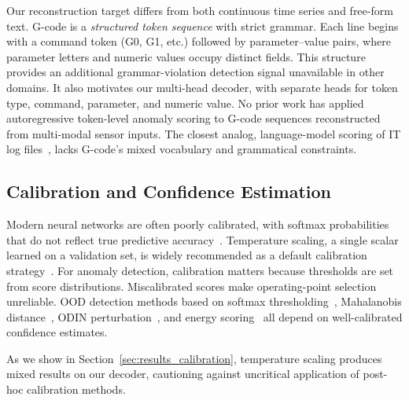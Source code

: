 Our reconstruction target differs from both continuous time series and free-form text.
G-code is a \emph{structured token sequence} with strict grammar.
Each line begins with a command token (G0, G1, etc.) followed by parameter--value pairs, where parameter letters and numeric values occupy distinct fields.
This structure provides an additional grammar-violation detection signal unavailable in other domains.
It also motivates our multi-head decoder, with separate heads for token type, command, parameter, and numeric value.
No prior work has applied autoregressive token-level anomaly scoring to G-code sequences reconstructed from multi-modal sensor inputs.
The closest analog, language-model scoring of IT log files~\cite{brown2018recurrent}, lacks G-code's mixed vocabulary and grammatical constraints.

\subsection{Calibration and Confidence Estimation}
\label{sec:rw_calibration}

Modern neural networks are often poorly calibrated, with softmax probabilities that do not reflect true predictive accuracy~\cite{guo2017calibration}.
Temperature scaling, a single scalar learned on a validation set, is widely recommended as a default calibration strategy~\cite{guo2017calibration,platt1999probabilistic,naeini2015obtaining}.
For anomaly detection, calibration matters because thresholds are set from score distributions.
Miscalibrated scores make operating-point selection unreliable.
OOD detection methods based on softmax thresholding~\cite{hendrycks2017baseline}, Mahalanobis distance~\cite{lee2018simple}, ODIN perturbation~\cite{liang2018enhancing}, and energy scoring~\cite{liu2020energy} all depend on well-calibrated confidence estimates.

As we show in Section~\ref{sec:results_calibration}, temperature scaling produces mixed results on our decoder, cautioning against uncritical application of post-hoc calibration methods.
